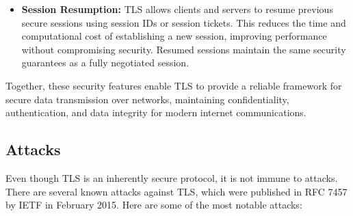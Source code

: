 \begin{itemize}
    \item \textbf{Session Resumption:} TLS allows clients and servers to resume previous secure sessions using session IDs or session tickets. This reduces the time and computational cost of establishing a new session, improving performance without compromising security. Resumed sessions maintain the same security guarantees as a fully negotiated session.

\end{itemize}

Together, these security features enable TLS to provide a reliable framework for secure data transmission over networks, maintaining confidentiality, authentication, and data integrity for modern internet communications.



\subsection{Attacks}
Even though TLS is an inherently secure protocol, it is not immune to attacks. There are several known attacks against TLS, which were published in RFC 7457 by IETF in February 2015. Here are some of the most notable attacks:

